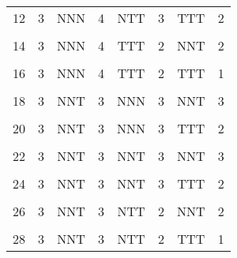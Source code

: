 \begin{table}[H]
{\begin{tabular}[t]{cccccccc}
			12 & 3 & NNN & 4 & NTT & 3 & TTT & 2\\
			\cellcolor{gray!6}{13} & \cellcolor{gray!6}{3} & \cellcolor{gray!6}{NNN} & \cellcolor{gray!6}{4} & \cellcolor{gray!6}{TTT} & \cellcolor{gray!6}{2} & \cellcolor{gray!6}{NNN} & \cellcolor{gray!6}{3}\\
			14 & 3 & NNN & 4 & TTT & 2 & NNT & 2\\
			\cellcolor{gray!6}{15} & \cellcolor{gray!6}{3} & \cellcolor{gray!6}{NNN} & \cellcolor{gray!6}{4} & \cellcolor{gray!6}{TTT} & \cellcolor{gray!6}{2} & \cellcolor{gray!6}{NTT} & \cellcolor{gray!6}{2}\\
			16 & 3 & NNN & 4 & TTT & 2 & TTT & 1\\
			\cellcolor{gray!6}{17} & \cellcolor{gray!6}{3} & \cellcolor{gray!6}{NNT} & \cellcolor{gray!6}{3} & \cellcolor{gray!6}{NNN} & \cellcolor{gray!6}{3} & \cellcolor{gray!6}{NNN} & \cellcolor{gray!6}{4}\\
			18 & 3 & NNT & 3 & NNN & 3 & NNT & 3\\
			\cellcolor{gray!6}{19} & \cellcolor{gray!6}{3} & \cellcolor{gray!6}{NNT} & \cellcolor{gray!6}{3} & \cellcolor{gray!6}{NNN} & \cellcolor{gray!6}{3} & \cellcolor{gray!6}{NTT} & \cellcolor{gray!6}{3}\\
			20 & 3 & NNT & 3 & NNN & 3 & TTT & 2\\
			\cellcolor{gray!6}{21} & \cellcolor{gray!6}{3} & \cellcolor{gray!6}{NNT} & \cellcolor{gray!6}{3} & \cellcolor{gray!6}{NNT} & \cellcolor{gray!6}{3} & \cellcolor{gray!6}{NNN} & \cellcolor{gray!6}{3}\\
			22 & 3 & NNT & 3 & NNT & 3 & NNT & 3\\
			\cellcolor{gray!6}{23} & \cellcolor{gray!6}{3} & \cellcolor{gray!6}{NNT} & \cellcolor{gray!6}{3} & \cellcolor{gray!6}{NNT} & \cellcolor{gray!6}{3} & \cellcolor{gray!6}{NTT} & \cellcolor{gray!6}{2}\\
			24 & 3 & NNT & 3 & NNT & 3 & TTT & 2\\
			\cellcolor{gray!6}{25} & \cellcolor{gray!6}{3} & \cellcolor{gray!6}{NNT} & \cellcolor{gray!6}{3} & \cellcolor{gray!6}{NTT} & \cellcolor{gray!6}{2} & \cellcolor{gray!6}{NNN} & \cellcolor{gray!6}{3}\\
			26 & 3 & NNT & 3 & NTT & 2 & NNT & 2\\
			\cellcolor{gray!6}{27} & \cellcolor{gray!6}{3} & \cellcolor{gray!6}{NNT} & \cellcolor{gray!6}{3} & \cellcolor{gray!6}{NTT} & \cellcolor{gray!6}{2} & \cellcolor{gray!6}{NTT} & \cellcolor{gray!6}{1}\\
			28 & 3 & NNT & 3 & NTT & 2 & TTT & 1\\

\end{tabular}}
\end{table}
